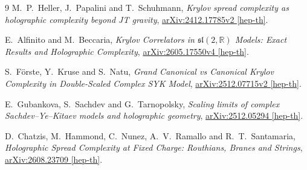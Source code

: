 \documentclass[a4paper,11pt]{ltjsarticle}
\numberwithin{equation}{section}
\begin{document}
\begin{thebibliography}{9}
M.~P.~Heller, J.~Papalini and T.~Schuhmann,
\emph{Krylov spread complexity as holographic complexity beyond JT gravity},
\href{https://arxiv.org/abs/2412.17785v2}{arXiv:2412.17785v2 [hep-th]}.

E.~Alfinito and M.~Beccaria,
\emph{Krylov Correlators in $\mathfrak{sl}(2,\mathbb R)$ Models: Exact Results and Holographic Complexity},
\href{https://arxiv.org/abs/2605.17550v4}{arXiv:2605.17550v4 [hep-th]}.

S.~F\"orste, Y.~Kruse and S.~Natu,
\emph{Grand Canonical vs Canonical Krylov Complexity in Double-Scaled Complex SYK Model},
\href{https://arxiv.org/abs/2512.07715v2}{arXiv:2512.07715v2 [hep-th]}.

E.~Gubankova, S.~Sachdev and G.~Tarnopolsky,
\emph{Scaling limits of complex Sachdev--Ye--Kitaev models and holographic geometry},
\href{https://arxiv.org/abs/2512.05294}{arXiv:2512.05294 [hep-th]}.

D.~Chatzis, M.~Hammond, C.~Nunez, A.~V.~Ramallo and R.~T.~Santamaria,
\emph{Holographic Spread Complexity at Fixed Charge: Routhians, Branes and Strings},
\href{https://arxiv.org/abs/2608.23709}{arXiv:2608.23709 [hep-th]}.
\end{thebibliography}
\end{document}
